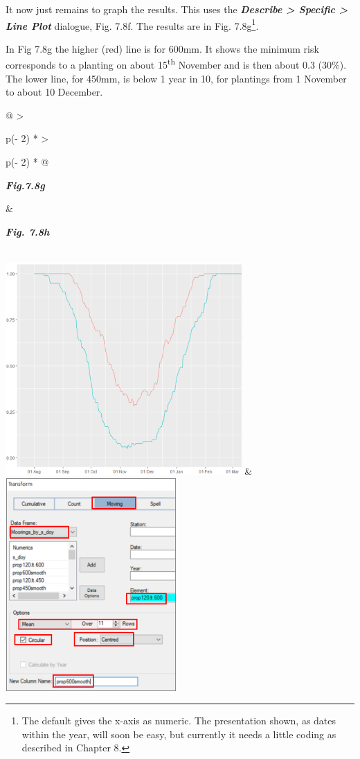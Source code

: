 \documentclass[
  letterpaper,
  DIV=11,
  numbers=noendperiod]{scrreprt}
\begin{document}
It now just remains to graph the results. This uses the
\textbf{\emph{Describe \textgreater{} Specific \textgreater{} Line
Plot}} dialogue, Fig. 7.8f. The results are in Fig. 7.8g\footnote{The
  default gives the x-axis as numeric. The presentation shown, as dates
  within the year, will soon be easy, but currently it needs a little
  coding as described in Chapter 8.}.

In Fig 7.8g the higher (red) line is for 600mm. It shows the minimum
risk corresponds to a planting on about 15\textsuperscript{th} November
and is then about 0.3 (30\%). The lower line, for 450mm, is below 1 year
in 10, for plantings from 1 November to about 10 December.

\begin{longtable}[]{@{}
  >{\raggedright\arraybackslash}p{(\columnwidth - 2\tabcolsep) * }
  >{\raggedright\arraybackslash}p{(\columnwidth - 2\tabcolsep) * }@{}}
\toprule\noalign{}
\begin{minipage}[b]{\linewidth}\raggedright
\textbf{\emph{Fig.7.8g}}
\end{minipage} & \begin{minipage}[b]{\linewidth}\raggedright
\textbf{\emph{Fig. 7.8h}}
\end{minipage} \\
\midrule\noalign{}
\endhead
\bottomrule\noalign{}
\endlastfoot
\includegraphics[width=3.54759in,height=3.20014in]{figures/Fig7.8g.png}
&
\includegraphics[width=2.57286in,height=3.19533in]{figures/Fig7.8h.png} \\
\end{longtable}
\end{document}

